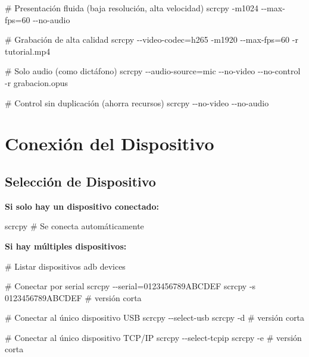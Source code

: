 \documentclass[
  doc,
  floatsintext,
  longtable,
  a4paper,
  nolmodern,
  notxfonts,
  notimes,
  12pt,
  colorlinks=true,linkcolor=blue,citecolor=blue,urlcolor=blue]{apa7}
\newenvironment{Shaded}{\begin{snugshade}}{\end{snugshade}}
\newcommand{\AttributeTok}[1]{\textcolor[rgb]{0.40,0.45,0.13}{#1}}
\newcommand{\CommentTok}[1]{\textcolor[rgb]{0.37,0.37,0.37}{#1}}
\newcommand{\ExtensionTok}[1]{\textcolor[rgb]{0.00,0.23,0.31}{#1}}
\newcommand{\NormalTok}[1]{\textcolor[rgb]{0.00,0.23,0.31}{#1}}
\newcommand{\OperatorTok}[1]{\textcolor[rgb]{0.37,0.37,0.37}{#1}}
\begin{document}
\begin{Shaded}
\begin{Highlighting}[]
\CommentTok{\# Presentación fluida (baja resolución, alta velocidad)}
\ExtensionTok{scrcpy} \AttributeTok{{-}m1024} \AttributeTok{{-}{-}max{-}fps}\OperatorTok{=}\NormalTok{60 }\AttributeTok{{-}{-}no{-}audio}

\CommentTok{\# Grabación de alta calidad}
\ExtensionTok{scrcpy} \AttributeTok{{-}{-}video{-}codec}\OperatorTok{=}\NormalTok{h265 }\AttributeTok{{-}m1920} \AttributeTok{{-}{-}max{-}fps}\OperatorTok{=}\NormalTok{60 }\AttributeTok{{-}r}\NormalTok{ tutorial.mp4}

\CommentTok{\# Solo audio (como dictáfono)}
\ExtensionTok{scrcpy} \AttributeTok{{-}{-}audio{-}source}\OperatorTok{=}\NormalTok{mic }\AttributeTok{{-}{-}no{-}video} \AttributeTok{{-}{-}no{-}control} \AttributeTok{{-}r}\NormalTok{ grabacion.opus}

\CommentTok{\# Control sin duplicación (ahorra recursos)}
\ExtensionTok{scrcpy} \AttributeTok{{-}{-}no{-}video} \AttributeTok{{-}{-}no{-}audio}
\end{Highlighting}
\end{Shaded}

\section{Conexión del Dispositivo}\label{conexiuxf3n-del-dispositivo}

\subsection{Selección de Dispositivo}\label{selecciuxf3n-de-dispositivo}

\textbf{Si solo hay un dispositivo conectado:}

\begin{Shaded}
\begin{Highlighting}[]
\ExtensionTok{scrcpy}  \CommentTok{\# Se conecta automáticamente}
\end{Highlighting}
\end{Shaded}

\textbf{Si hay múltiples dispositivos:}

\begin{Shaded}
\begin{Highlighting}[]
\CommentTok{\# Listar dispositivos}
\ExtensionTok{adb}\NormalTok{ devices}

\CommentTok{\# Conectar por serial}
\ExtensionTok{scrcpy} \AttributeTok{{-}{-}serial}\OperatorTok{=}\NormalTok{0123456789ABCDEF}
\ExtensionTok{scrcpy} \AttributeTok{{-}s}\NormalTok{ 0123456789ABCDEF  }\CommentTok{\# versión corta}

\CommentTok{\# Conectar al único dispositivo USB}
\ExtensionTok{scrcpy} \AttributeTok{{-}{-}select{-}usb}
\ExtensionTok{scrcpy} \AttributeTok{{-}d}  \CommentTok{\# versión corta}

\CommentTok{\# Conectar al único dispositivo TCP/IP}
\ExtensionTok{scrcpy} \AttributeTok{{-}{-}select{-}tcpip}
\ExtensionTok{scrcpy} \AttributeTok{{-}e}  \CommentTok{\# versión corta}
\end{Highlighting}
\end{Shaded}
\end{document}
